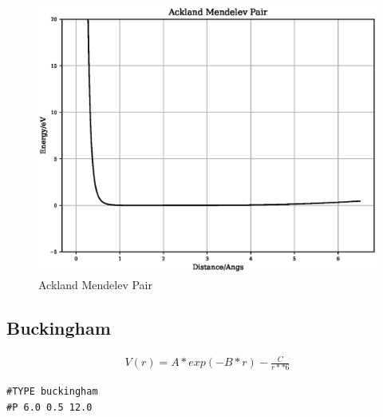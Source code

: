 \documentclass[12pt,twoside]{manual}
\begin{document}
\begin{appendices}
\FloatBarrier
\begin{figure}[h]
  \begin{center}
    \includegraphics[scale=0.5]{img/plots/ackland_mendelev_pair.eps}
    \caption{Ackland Mendelev Pair}
    \label{graph:graph1}
  \end{center}
\end{figure}
\FloatBarrier










\subsection{Buckingham}

\begin{equation}
\begin{split}
V(r) = A * exp(-B * r) - \frac{C}{r**6}
\end{split}
\label{eq:eqBuckingham}
\end{equation}

\begin{lstlisting}[style=pseudocode,caption={Buckingham}]
#TYPE buckingham
#P 6.0 0.5 12.0
\end{lstlisting}


\end{appendices}
\end{document}
